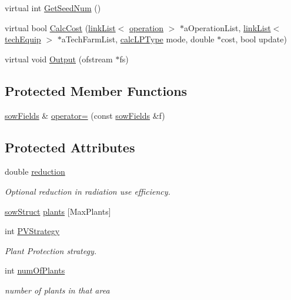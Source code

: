 \begin{DoxyCompactItemize}
virtual int \hyperlink{classsow_fields_af361db1618e35471eaed378178d3b554}{GetSeedNum} ()
\item 
virtual bool \hyperlink{classsow_fields_a7834909587530be2801797f19d3fa242}{CalcCost} (\hyperlink{classlink_list}{linkList}$<$ \hyperlink{classoperation}{operation} $>$ $\ast$aOperationList, \hyperlink{classlink_list}{linkList}$<$ \hyperlink{classtech_equip}{techEquip} $>$ $\ast$aTechFarmList, \hyperlink{typer_8h_af05cf854fc14086a0d6404be5ae9813f}{calcLPType} mode, double $\ast$cost, bool update)
\item 
virtual void \hyperlink{classsow_fields_ad522bac768458cd78dfd8766545556bb}{Output} (ofstream $\ast$fs)
\end{DoxyCompactItemize}
\subsection*{Protected Member Functions}
\begin{DoxyCompactItemize}
\item 
\hyperlink{classsow_fields}{sowFields} \& \hyperlink{classsow_fields_abc76f0e726ab2388e9f9be21d6c0b8be}{operator=} (const \hyperlink{classsow_fields}{sowFields} \&f)
\end{DoxyCompactItemize}
\subsection*{Protected Attributes}
\begin{DoxyCompactItemize}
\item 
double \hyperlink{classsow_fields_a963b55ec84f8451164ee615b1fa52927}{reduction}
\begin{DoxyCompactList}\small\item\em Optional reduction in radiation use efficiency. \item\end{DoxyCompactList}\item 
\hyperlink{structsow_fields_1_1sow_struct}{sowStruct} \hyperlink{classsow_fields_ae686b511409010a29219373a85126e36}{plants} \mbox{[}MaxPlants\mbox{]}
\item 
int \hyperlink{classsow_fields_ab43b87025b3e78f3624616754dd98120}{PVStrategy}
\begin{DoxyCompactList}\small\item\em Plant Protection strategy. \item\end{DoxyCompactList}\item 
int \hyperlink{classsow_fields_a8db7db6666e24673192929e5ded6f997}{numOfPlants}
\begin{DoxyCompactList}\small\item\em number of plants in that area \item\end{DoxyCompactList}\end{DoxyCompactItemize}


